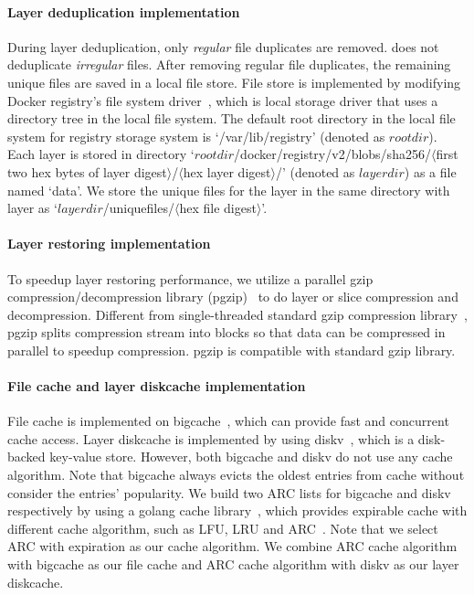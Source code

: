 \paragraph{Layer deduplication implementation}
During layer deduplication, only \emph{regular} file duplicates are removed.
\sysname does not deduplicate \emph{irregular} files.
After removing regular file duplicates, the remaining unique files are saved in a local file store.
File store is implemented by modifying Docker registry's file system driver~\cite{xxx}, 
which is local storage driver 
that uses a directory tree in the local file system.
The default root directory in the local file system for registry storage system is `/var/lib/registry' (denoted as $rootdir$).
Each layer is stored in directory `$rootdir$/docker/registry/v2/blobs/sha256/$\langle$first two hex bytes of layer digest$\rangle$/$\langle$hex layer digest$\rangle$/' (denoted as $layerdir$) as a file named `data'.
We store the unique files for the layer in the same directory with layer as `$layerdir$/uniquefiles/$\langle$hex file digest$\rangle$'.

\paragraph{Layer restoring implementation}
To speedup layer restoring performance,
we utilize a parallel gzip compression/decompression library (pgzip)~\cite{xxx} to do layer or slice compression and decompression.
Different from single-threaded standard gzip compression library~\cite{xxx},
pgzip splits compression stream into blocks so that data can be compressed in parallel to speedup compression.
pgzip is compatible with standard gzip library.

\paragraph{File cache and layer diskcache implementation}

File cache is implemented on bigcache~\cite{xxx}, which can provide fast and concurrent cache access.
Layer diskcache is implemented by using diskv~\cite{xxx}, which is a disk-backed key-value store.
However, both bigcache and diskv do not use any cache algorithm. 
Note that bigcache always evicts the oldest entries from cache without consider the entries' popularity.
We build two ARC lists for bigcache and diskv respectively by using a golang cache library~\cite{xxx}, 
which provides expirable cache with different cache algorithm, such as LFU, LRU and ARC~\cite{xxx}.
Note that we select ARC with expiration as our cache algorithm.
We combine ARC cache algorithm with bigcache as our file cache
and ARC cache algorithm with diskv as our layer diskcache.

